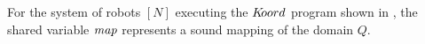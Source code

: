 %
%


\begin{theorem}
    For the system of robots $[N]$ executing the $K\kern-2pt oord$ program shown in , the shared variable $\mathit{map}$ represents a sound mapping of the domain $Q$.
\end{theorem}

